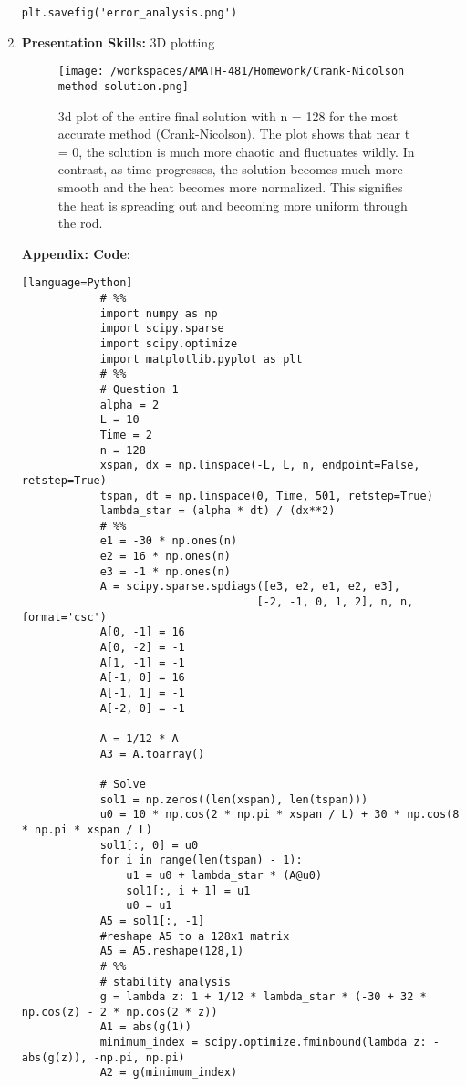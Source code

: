 \documentclass[a4paper,12pt, fleqn]{article}
\begin{document}
\begin{enumerate}
\begin{lstlisting}[basicstyle=\tiny]
            plt.savefig('error_analysis.png')

        \end{lstlisting}

    \item 
        \textbf{Presentation Skills:} 3D plotting \\
        \begin{figure}[H]
            \centering
            \texttt{[image: /workspaces/AMATH-481/Homework/Crank-Nicolson method solution.png]}
            \caption{3d plot of the entire final solution with n = 128 for the most accurate method (Crank-Nicolson). 
            The plot shows that near t = 0, the solution is much more chaotic and fluctuates wildly. In contrast, as time
            progresses, the solution becomes much more smooth and the heat becomes more normalized. This signifies the heat is spreading out and becoming more uniform through the rod.}
            \label{fig:hw4-1b}
        \end{figure}

        \textbf{Appendix: Code}: \\
        \begin{lstlisting}[basicstyle=\tiny]
        [language=Python]
            # %%
            import numpy as np
            import scipy.sparse
            import scipy.optimize
            import matplotlib.pyplot as plt
            # %%
            # Question 1
            alpha = 2
            L = 10
            Time = 2
            n = 128
            xspan, dx = np.linspace(-L, L, n, endpoint=False, retstep=True)
            tspan, dt = np.linspace(0, Time, 501, retstep=True)
            lambda_star = (alpha * dt) / (dx**2)
            # %%
            e1 = -30 * np.ones(n)
            e2 = 16 * np.ones(n)
            e3 = -1 * np.ones(n)
            A = scipy.sparse.spdiags([e3, e2, e1, e2, e3],
                                    [-2, -1, 0, 1, 2], n, n, format='csc')
            A[0, -1] = 16
            A[0, -2] = -1
            A[1, -1] = -1
            A[-1, 0] = 16
            A[-1, 1] = -1
            A[-2, 0] = -1
            
            A = 1/12 * A
            A3 = A.toarray()
            
            # Solve
            sol1 = np.zeros((len(xspan), len(tspan)))
            u0 = 10 * np.cos(2 * np.pi * xspan / L) + 30 * np.cos(8 * np.pi * xspan / L)
            sol1[:, 0] = u0
            for i in range(len(tspan) - 1):
                u1 = u0 + lambda_star * (A@u0)
                sol1[:, i + 1] = u1 
                u0 = u1
            A5 = sol1[:, -1]
            #reshape A5 to a 128x1 matrix
            A5 = A5.reshape(128,1)
            # %%
            # stability analysis
            g = lambda z: 1 + 1/12 * lambda_star * (-30 + 32 * np.cos(z) - 2 * np.cos(2 * z))
            A1 = abs(g(1))
            minimum_index = scipy.optimize.fminbound(lambda z: -abs(g(z)), -np.pi, np.pi)
            A2 = g(minimum_index)
            

\end{lstlisting}
\end{enumerate}
\end{document}
